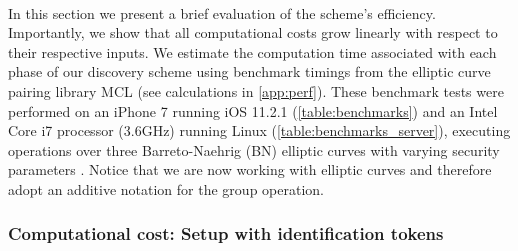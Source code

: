 	\paragraph{} In this section we present a brief evaluation of the scheme's efficiency. Importantly, we show that all computational costs grow linearly with respect to their respective inputs. We estimate the computation time associated with each phase of our discovery scheme using benchmark timings from the elliptic curve pairing library MCL \cite{MCLLib} (see calculations in \autoref{app:perf}). These benchmark tests were performed on an iPhone 7 running iOS 11.2.1 (\autoref{table:benchmarks}) and an Intel Core i7 processor (3.6GHz) running Linux (\autoref{table:benchmarks_server}), executing operations over three Barreto-Naehrig (BN) elliptic curves with varying security parameters \cite{MCLBench}.  Notice that we are now working with elliptic curves and therefore adopt an additive notation for the group operation.
	
	
	
	\subsubsection{Computational cost: Setup with identification tokens}
	
